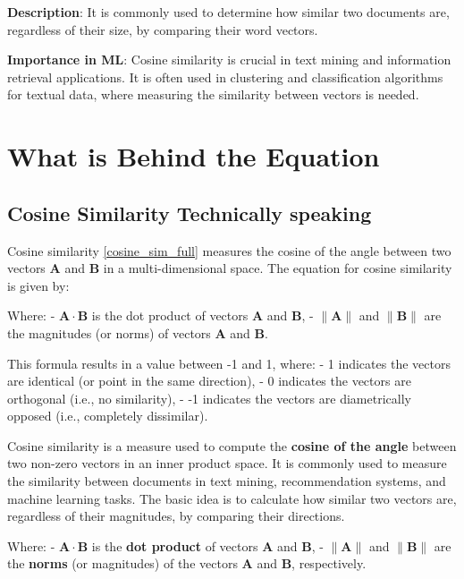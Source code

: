 \documentclass[
  12 pt,
  a4paper,
]{book}
\numberwithin{equation}{section}
\theoremstyle{plain}      %
\theoremstyle{definition} %
\theoremstyle{remark}     %
\theoremstyle{note}         %
\begin{document}
\textbf{Description}: It is commonly used to determine how similar two
documents are, regardless of their size, by comparing their word
vectors.

\textbf{Importance in ML}: Cosine similarity is crucial in text mining
and information retrieval applications. It is often used in clustering
and classification algorithms for textual data, where measuring the
similarity between vectors is needed.

\vspace*{\fill}

\newpage

\hypertarget{what-is-behind-the-equation-5}{%
\section{What is Behind the
Equation}\label{what-is-behind-the-equation-5}}

\hypertarget{cosine-similarity-technically-speaking}{%
\subsection{Cosine Similarity Technically
speaking}\label{cosine-similarity-technically-speaking}}

Cosine similarity \ref{cosine_sim_full} measures the cosine of the angle
between two vectors \(\mathbf{A}\) and \(\mathbf{B}\) in a
multi-dimensional space. The equation for cosine similarity is given by:

Where: - \(\mathbf{A} \cdot \mathbf{B}\) is the dot product of vectors
\(\mathbf{A}\) and \(\mathbf{B}\), - \(\| \mathbf{A} \|\) and
\(\| \mathbf{B} \|\) are the magnitudes (or norms) of vectors
\(\mathbf{A}\) and \(\mathbf{B}\).

This formula results in a value between -1 and 1, where: - 1 indicates
the vectors are identical (or point in the same direction), - 0
indicates the vectors are orthogonal (i.e., no similarity), - -1
indicates the vectors are diametrically opposed (i.e., completely
dissimilar).

Cosine similarity is a measure used to compute the \textbf{cosine of the
angle} between two non-zero vectors in an inner product space. It is
commonly used to measure the similarity between documents in text
mining, recommendation systems, and machine learning tasks. The basic
idea is to calculate how similar two vectors are, regardless of their
magnitudes, by comparing their directions.

Where: - \(\mathbf{A} \cdot \mathbf{B}\) is the \textbf{dot product} of
vectors \(\mathbf{A}\) and \(\mathbf{B}\), - \(\| \mathbf{A} \|\) and
\(\| \mathbf{B} \|\) are the \textbf{norms} (or magnitudes) of the
vectors \(\mathbf{A}\) and \(\mathbf{B}\), respectively.
\end{document}
